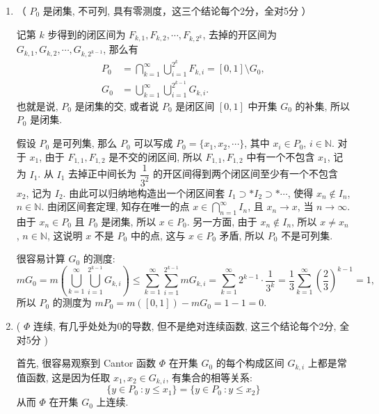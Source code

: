\begin{solution}
\begin{enumerate}
\item （ \(P_0\) 是闭集, 不可列, 具有零测度，这三个结论每个2分，全对5分 ）

记第 \(k\) 步得到的闭区间为 \(F_{k, 1}, F_{k, 2}, \cdots, F_{k, 2^k}\), 去掉的开区间为 \(G_{k, 1}, G_{k, 2}, \cdots, G_{k, 2^{k-1}}\), 那么有
\[\begin{aligned}
P_0 & = \bigcap\limits_{k=1}^{\infty} \bigcup\limits_{i=1}^{2^k} F_{k, i} = [0, 1] \setminus G_0, \\
G_0 & = \bigcup\limits_{k=1}^{\infty} \bigcup\limits_{i=1}^{2^{k-1}} G_{k, i}.
\end{aligned}\]
也就是说, \(P_0\) 是闭集的交, 或者说 \(P_0\) 是闭区间 \([0, 1]\) 中开集 \(G_0\) 的补集, 所以 \(P_0\) 是闭集.

假设 \(P_0\) 是可列集, 那么 \(P_0\) 可以写成 \(P_0 = \{ x_1, x_2, \cdots \}\), 其中 \(x_i \in P_0\), \(i \in \mathbb{N}\). 对于 \(x_1\), 由于 \(F_{1, 1}, F_{1, 2}\) 是不交的闭区间, 所以 \(F_{1, 1}, F_{1, 2}\) 中有一个不包含 \(x_1\), 记为 \(I_1\). 从 \(I_1\) 去掉正中间长为 \(\dfrac{1}{3^2}\) 的开区间得到两个闭区间至少有一个不包含 \(x_2\), 记为 \(I_2\). 由此可以归纳地构造出一个闭区间套 \(I_1 \supset* I_2 \supset* \cdots\), 使得 \(x_n \notin I_n\), \(n \in \mathbb{N}\). 由闭区间套定理, 知存在唯一的点 \(x \in \bigcap\limits_{n=1}^{\infty} I_n\), 且 \(x_n \to x\), 当 \(n \to \infty\). 由于 \(x_n \in P_0\) 且 \(P_0\) 是闭集, 所以 \(x \in P_0\). 另一方面, 由于 \(x_n \notin I_n\), 所以 \(x \neq x_n\), \(n \in \mathbb{N}\), 这说明 \(x\) 不是 \(P_0\) 中的点, 这与 \(x \in P_0\) 矛盾, 所以 \(P_0\) 不是可列集.

很容易计算 \(G_0\) 的测度:
\[m G_0 = m \left( \bigcup\limits_{k=1}^{\infty} \bigcup\limits_{i=1}^{2^{k-1}} G_{k, i} \right) \leqslant \sum\limits_{k=1}^{\infty} \sum\limits_{i=1}^{2^{k-1}} m G_{k, i} = \sum\limits_{k=1}^{\infty} 2^{k-1} \cdot \dfrac{1}{3^k} = \dfrac{1}{3} \sum\limits_{k=1}^{\infty} \left( \dfrac{2}{3} \right)^{k-1} = 1,\]
所以 \(P_0\) 的测度为 \(m P_0 = m ([0, 1]) - m G_0 = 1 - 1 = 0\).
\item ( \(\Phi\) 连续, 有几乎处处为0的导数, 但不是绝对连续函数, 这三个结论每个2分, 全对5分 )  

首先, 很容易观察到 Cantor 函数 \(\Phi\) 在开集 \(G_0\) 的每个构成区间 \(G_{k, i}\) 上都是常值函数, 这是因为任取 \(x_1, x_2 \in G_{k, i}\), 有集合的相等关系:
\[\{y \in P_0 ~ \colon y \leqslant x_1\} = \{y \in P_0 ~ \colon y \leqslant x_2\}\]
从而 \(\Phi\) 在开集 \(G_0\) 上连续.


\end{enumerate}
\end{solution}
